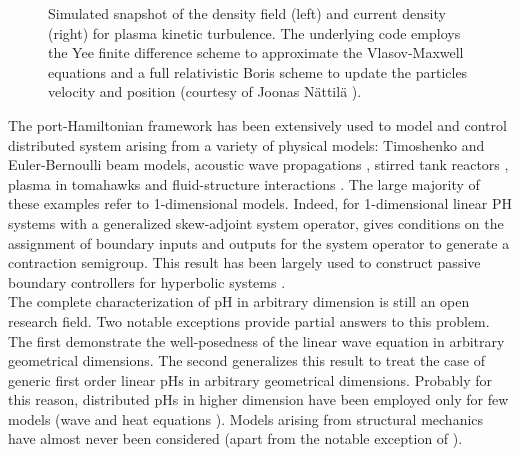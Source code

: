 \begin{figure}[htbp]%
	\centering
	\hspace{8pt}%
	\caption[]{Simulated snapshot of the density field (left) and current density (right) for plasma kinetic turbulence. The underlying code employs the Yee finite difference scheme \cite{yee1966numerical} to approximate the Vlasov-Maxwell equations and a full relativistic Boris scheme \cite{boris1970relativistic} to update the particles velocity and position (courtesy of Joonas N\"attil\"a \cite{nattila2019runko}).}%
	\label{fig:plasma}%
\end{figure}

The port-Hamiltonian framework has been extensively used to model and control distributed system arising from a variety of physical models: Timoshenko \cite{macchelli2004timo} and Euler-Bernoulli  \cite{aoues2017modeling} beam models, acoustic wave propagations \cite{trenchant2018}, stirred tank reactors \cite{ramirez2013irreversible},  plasma in tomahawks \cite{vu2016plasma} and fluid-structure interactions \cite{cardoso2017}. The large majority of these examples refer to 1-dimensional models. Indeed, for 1-dimensional linear PH systems with a generalized skew-adjoint system operator, \cite{legorrec2005} gives conditions on the assignment of boundary inputs and outputs for the system operator to generate a contraction semigroup. This result has been largely used to construct passive boundary controllers for hyperbolic systems \cite{villegas2009exponential,macchelli2016synthesis,macchelli2020exponential}. \\


The complete characterization of pH in arbitrary dimension is still an open research field. Two notable exceptions \cite{zwart2015wave,skrepek2019wellposedness} provide partial answers to this problem. The first demonstrate the well-posedness of the linear wave equation in arbitrary geometrical dimensions. The second generalizes this result to treat the case of generic first order linear pHs in arbitrary geometrical dimensions. Probably for this reason, distributed pHs in higher dimension have been employed only for few models (wave and heat equations \cite{kotyczka2019numerical}). Models arising from structural mechanics have almost never been considered (apart from the notable exception of \cite{macchelli2005mindlin}).  \\

